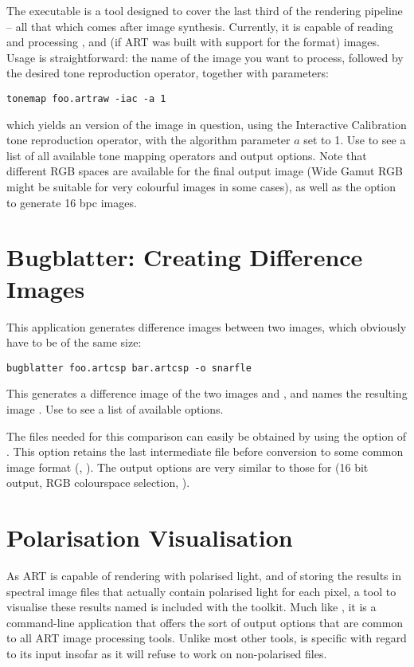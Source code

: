 The  executable is a tool designed to cover the last third of the rendering pipeline -- all that which comes after image synthesis. Currently, it is capable of reading and processing ,  and (if ART was built with support for the format)  images. Usage is straightforward: the name of the image you want to process, followed by the desired tone reproduction operator, together with parameters:

\begin{verbatim}
tonemap foo.artraw -iac -a 1 
\end{verbatim}

which yields an  version of the  image in
question, using the Interactive Calibration tone reproduction operator, with the algorithm parameter $a$ set to 1. Use  to see a list of all available tone mapping operators and output options. Note that different RGB spaces are available for the final output image (Wide Gamut RGB might be suitable for very colourful images in some cases), as well as the option to generate 16 bpc  images.

\section{Bugblatter: Creating Difference Images}
\label{sec:using:bugblatter}

This application generates difference images between two  images, which obviously have to be of the same size:

\begin{verbatim}
bugblatter foo.artcsp bar.artcsp -o snarfle
\end{verbatim}

This generates a difference image of the two images  and , and names the resulting image . Use  to see a list of available options.

The  files needed for this comparison can easily be obtained by using the  option of . This option retains the last intermediate  file before conversion to some common image format (, ). The output options are very similar to those for  (16 bit output, RGB colourspace selection, \etc).

\section{Polarisation Visualisation}
As ART is capable of rendering with polarised light, and of storing the results in spectral image files that actually contain polarised light for each pixel, a tool to visualise these results named  is included with the toolkit. Much like , it is a command-line application that offers the sort of output options that are common to all ART image processing tools. Unlike most other tools,  is specific with regard to its input insofar as it will refuse to work on non-polarised  files.

